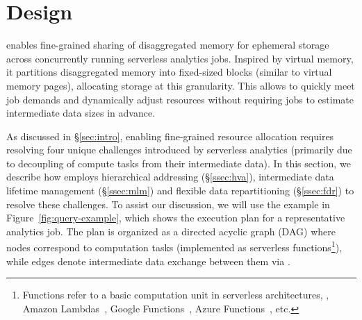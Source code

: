 \section{\jiffy Design}
\label{sec:jiffydesign}

\jiffy enables fine-grained sharing of disaggregated memory for ephemeral storage across concurrently running serverless analytics jobs. Inspired by virtual memory, it partitions disaggregated memory into fixed-sized blocks (similar to virtual memory pages), allocating storage at this granularity. This allows \jiffy to quickly meet job demands and dynamically adjust resources without requiring jobs to estimate intermediate data sizes in advance.


As discussed in \S\ref{sec:intro}, enabling fine-grained resource allocation requires resolving four unique challenges introduced by serverless analytics (primarily due to decoupling of compute tasks from their intermediate data). In this section, we describe how \jiffy employs hierarchical addressing (\S\ref{ssec:hva}), intermediate data lifetime management (\S\ref{ssec:mlm}) and flexible data repartitioning (\S\ref{ssec:fdr}) to resolve these challenges. To assist our discussion, we will use the example in Figure~\ref{fig:query-example}, which shows the execution plan for a representative analytics job. The plan is organized as a directed acyclic graph (DAG) where nodes correspond to computation tasks (implemented as serverless functions\footnote{Functions refer to a basic computation unit in serverless architectures, \eg, Amazon Lambdas~\cite{alambda}, Google Functions~\cite{googlefunctions}, Azure Functions~\cite{azureFunctions}, etc.}), while edges denote intermediate data exchange between them via \jiffy. 


